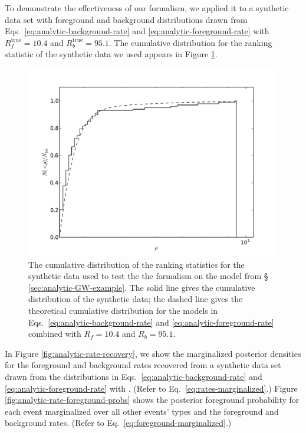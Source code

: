 \documentclass[aps,prd,reprint]{revtex4-1}
\begin{document}
To demonstrate the effectiveness of our formalism, we applied it to a
synthetic data set with foreground and background distributions drawn
from Eqs.~\eqref{eq:analytic-background-rate} and
\eqref{eq:analytic-foreground-rate} with $R_f^\mathrm{true} = 10.4$
and $R_b^\mathrm{true} = 95.1$.  The cumulative distribution for the
ranking statistic of the synthetic data we used appears in Figure
\ref{fig:analytic-data-cumulative}.

\begin{figure}
  \includegraphics[width=\columnwidth]{data}
  \caption{\label{fig:analytic-data-cumulative} The cumulative
    distribution of the ranking statistics for the synthetic data used
    to test the the formalism on the model from \S
    \ref{sec:analytic-GW-example}.  The solid line gives the
    cumulative distribution of the synthetic data; the dashed line
    gives the theoretical cumulative distribution for the models in
    Eqs.~\eqref{eq:analytic-background-rate} and
    \eqref{eq:analytic-foreground-rate} combined with $R_f = 10.4$ and
    $R_b = 95.1$.}
\end{figure}

In Figure \ref{fig:analytic-rate-recovery}, we show the marginalized
posterior densities for the foreground and background rates recovered
from a synthetic data set drawn from the distributions in
Eqs.~\eqref{eq:analytic-background-rate} and
\eqref{eq:analytic-foreground-rate} with .  (Refer to
Eq.~\eqref{eq:rates-marginalized}.)  Figure
\ref{fig:analytic-rate-foreground-probs} shows the posterior
foreground probability for each event marginalized over all other
events' types and the foreground and background rates.  (Refer to
Eq.~\eqref{eq:foreground-marginalized}.)
\end{document}
